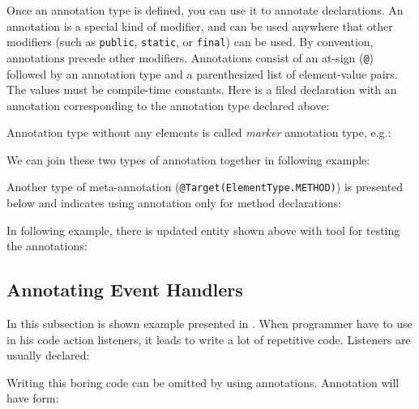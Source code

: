 \documentclass[11pt,twoside,a4paper]{book}
\begin{document}
Once an annotation type is defined, you can use it to annotate declarations. An
annotation is a special kind of modifier, and can be used anywhere that other
modifiers (such as \verb|public|, \verb|static|, or \verb|final|) can be used.
By convention, annotations precede other modifiers. Annotations consist of an at-sign
(\verb|@|) followed by an annotation type and a parenthesized list of
element-value pairs. The values must be compile-time constants. Here is a filed
declaration with an annotation corresponding to the annotation type declared above:



Annotation type without any elements is called \textit{marker}
annotation type, e.g.:



We can join these two types of annotation together in following example:



Another type of meta-annotation
(\verb|@Target(ElementType.METHOD)|) is presented below and indicates using
annotation only for method declarations:



In following example, there is updated entity shown above with tool for testing
the annotations:


\newpage



\subsection{Annotating Event Handlers}
In this subsection is shown example presented in
\cite{horstmannCornell:coreJava}. When programmer have to use in his code action
listeners, it leads to write a lot of repetitive code. Listeners are usually declared:



Writing this boring code can be omitted by using annotations. Annotation will
have form:
\end{document}
